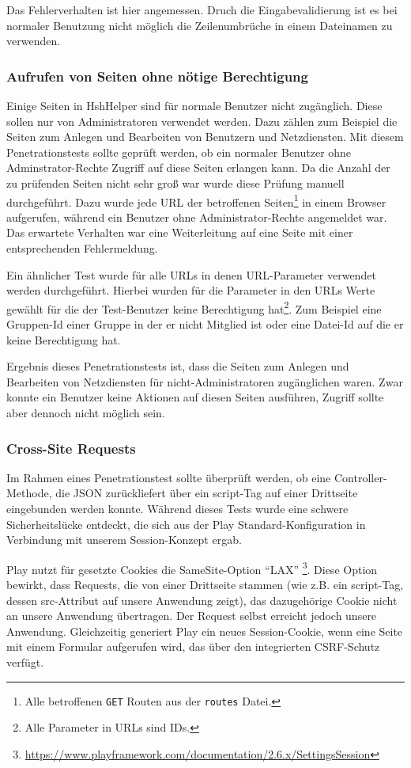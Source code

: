 \documentclass[12pt,DIV14,BCOR10mm,a4paper,parskip=half-,headsepline,headinclude,english,ngerman,bibliography=totocnumbered]{scrreprt}
\begin{document}
Das Fehlerverhalten ist hier angemessen. Druch die Eingabevalidierung ist es bei normaler Benutzung nicht möglich die Zeilenumbrüche in einem Dateinamen zu verwenden.


\subsubsection{Aufrufen von Seiten ohne nötige Berechtigung}
Einige Seiten in HshHelper sind für normale Benutzer nicht zugänglich. Diese sollen nur von Administratoren verwendet werden. Dazu zählen zum Beispiel die Seiten zum Anlegen und Bearbeiten von Benutzern und Netzdiensten. Mit diesem Penetrationstests sollte geprüft werden, ob ein normaler Benutzer ohne Adminstrator-Rechte Zugriff auf diese Seiten erlangen kann. Da die Anzahl der zu prüfenden Seiten nicht sehr groß war wurde diese Prüfung manuell durchgeführt. Dazu wurde jede URL der betroffenen Seiten\footnote{Alle betroffenen \texttt{GET} Routen aus der \texttt{routes} Datei.} in einem Browser aufgerufen, während ein Benutzer ohne Administrator-Rechte angemeldet war. Das erwartete Verhalten war eine Weiterleitung auf eine Seite mit einer entsprechenden Fehlermeldung.

Ein ähnlicher Test wurde für alle URLs in denen URL-Parameter verwendet werden durchgeführt. Hierbei wurden für die Parameter in den URLs Werte gewählt für die der Test-Benutzer keine Berechtigung hat\footnote{Alle Parameter in URLs sind IDs.}. Zum Beispiel eine Gruppen-Id einer Gruppe in der er nicht Mitglied ist oder eine Datei-Id auf die er keine Berechtigung hat.

Ergebnis dieses Penetrationstests ist, dass die Seiten zum Anlegen und Bearbeiten von Netzdiensten für nicht-Administratoren zugänglichen waren. Zwar konnte ein Benutzer keine Aktionen auf diesen Seiten ausführen, Zugriff sollte aber dennoch nicht möglich sein.

\subsubsection{Cross-Site Requests}
\label{csrf:analyse}
Im Rahmen eines Penetrationstest sollte überprüft werden, ob eine Controller-Methode, die JSON zurückliefert über ein script-Tag auf einer Drittseite eingebunden werden konnte. Während dieses Tests wurde eine schwere Sicherheitslücke entdeckt, die sich aus der Play Standard-Konfiguration in Verbindung mit unserem Session-Konzept ergab.

Play nutzt für gesetzte Cookies die SameSite-Option \enquote{LAX} \footnote{\url{https://www.playframework.com/documentation/2.6.x/SettingsSession}}. Diese Option bewirkt, dass Requests, die von einer Drittseite stammen (wie z.B. ein script-Tag, dessen src-Attribut auf unsere Anwendung zeigt), das dazugehörige Cookie nicht an unsere Anwendung übertragen. Der Request selbst erreicht jedoch unsere Anwendung. Gleichzeitig generiert Play ein neues Session-Cookie, wenn eine Seite mit einem Formular aufgerufen wird, das über den integrierten CSRF-Schutz verfügt.
\end{document}
